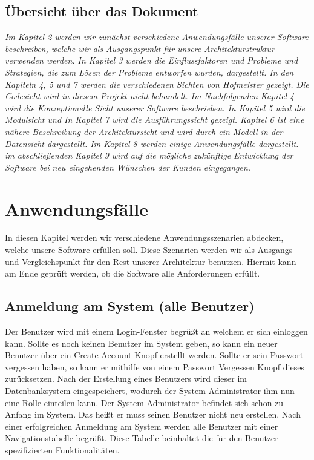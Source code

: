 \documentclass[enabledeprecatedfontcommands,fontsize=12pt,paper=a4,twoside]{scrartcl}
\begin{document}
\subsection{Übersicht über das Dokument}

{ \em Im Kapitel 2 werden wir zunächst verschiedene Anwendungsfälle unserer Software beschreiben, welche wir als Ausgangspunkt für unsere Architekturstruktur verwenden werden. In Kapitel 3 werden die Einflussfaktoren und Probleme und Strategien, die zum Lösen der Probleme entworfen wurden, dargestellt.
In den Kapiteln 4, 5 und 7 werden die verschiedenen Sichten von Hofmeister gezeigt. Die Codesicht wird in diesem Projekt nicht behandelt.
Im Nachfolgenden Kapitel 4 wird die Konzeptionelle Sicht unserer Software beschrieben. In Kapitel 5 wird die Modulsicht und In Kapitel 7 wird die Ausführungssicht gezeigt. Kapitel 6 ist eine nähere Beschreibung der Architektursicht und wird durch ein Modell in der Datensicht dargestellt.
Im Kapitel 8 werden einige Anwendungsfälle dargestellt. im abschließenden Kapitel 9 wird auf die mögliche zukünftige Entwicklung der Software bei neu eingehenden Wünschen der Kunden eingegangen.

}



\section{Anwendungsfälle}

In diesen Kapitel werden wir verschiedene Anwendungsszenarien abdecken, welche unsere Software erfüllen soll. Diese Szenarien werden wir als Ausgangs- und Vergleichspunkt für den Rest unserer Architektur benutzen. Hiermit kann am Ende geprüft werden, ob die Software alle Anforderungen erfüllt. 

\subsection{Anmeldung am System (alle Benutzer)}

Der Benutzer wird mit einem Login-Fenster begrüßt an welchem er sich einloggen kann. Sollte es noch keinen Benutzer im System geben, so kann ein neuer Benutzer über ein Create-Account Knopf erstellt werden. Sollte er sein Passwort vergessen haben, so kann er mithilfe von einem Passwort Vergessen Knopf dieses zurücksetzen.
Nach der Erstellung eines Benutzers wird dieser im Datenbanksystem eingespeichert, wodurch der System Administrator ihm nun eine Rolle einteilen kann.
Der System Administrator befindet sich schon zu Anfang im System. Das heißt er muss seinen Benutzer nicht neu erstellen.
Nach einer erfolgreichen Anmeldung am System werden alle Benutzer mit einer Navigationstabelle begrüßt. Diese Tabelle beinhaltet die für den Benutzer spezifizierten Funktionalitäten.
\end{document}
